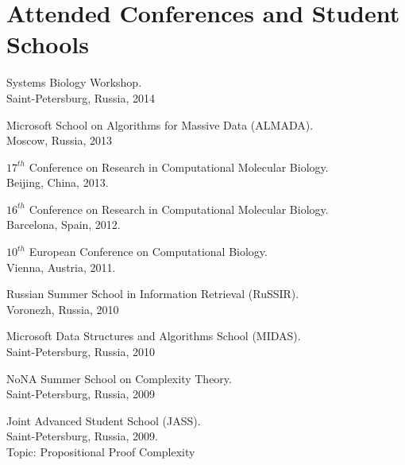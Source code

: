 \section{Attended Conferences and Student Schools}
%
\begin{innerlist}

\item Systems Biology Workshop. \\
Saint-Petersburg, Russia, 2014

\item Microsoft School on Algorithms for Massive Data (ALMADA). \\
Moscow, Russia, 2013

\item $17^{th}$ Conference on Research in Computational Molecular Biology.\\ 
Beijing, China, 2013.

\item $16^{th}$ Conference on Research in Computational Molecular Biology.\\ 
Barcelona, Spain, 2012.

\item $10^{th}$ European Conference on Computational Biology.\\ 
Vienna, Austria, 2011.

\item Russian Summer School in Information Retrieval (RuSSIR).\\ 
Voronezh, Russia, 2010

\item Microsoft Data Structures and Algorithms School (MIDAS).\\ 
Saint-Petersburg, Russia, 2010

\item NoNA Summer School on Complexity Theory.\\
Saint-Petersburg, Russia, 2009

\item Joint Advanced Student School (JASS).\\
Saint-Petersburg, Russia, 2009.\\ 
Topic: Propositional Proof Complexity

\end{innerlist}

